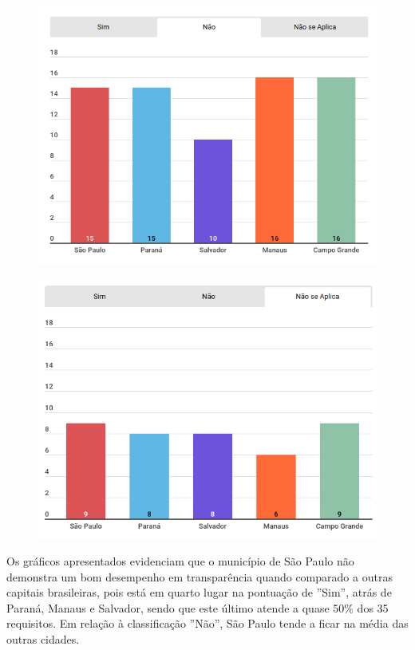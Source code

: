 \begin{figure}[H]
    \centering
    \includegraphics[scale=0.5]{images/grafico3.png}
    \label{fig:4}
\end{figure}

\begin{figure}[H]
    \centering
    \includegraphics[scale=0.5]{images/grafico4.png}
    \label{fig:5}
\end{figure}

Os gráficos apresentados evidenciam que o município de São Paulo não demonstra um bom desempenho em transparência quando comparado a outras capitais brasileiras, pois está em quarto lugar na pontuação de ''Sim'', atrás de Paraná, Manaus e Salvador, sendo que este último atende a quase 50\% dos 35 requisitos. Em relação à classificação ''Não'', São Paulo tende a ficar na média das outras cidades.

